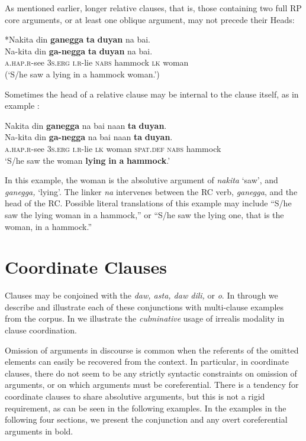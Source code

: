 As mentioned earlier, longer relative clauses, that is, those containing two full RP core arguments, or at least one oblique argument, may not precede their Heads:

\ea
*Nakita  din  \textbf{ganegga}  \textbf{ta}  \textbf{duyan}  na  bai. \smallskip\\
\gll *Na-kita  din  \textbf{ga-negga}  \textbf{ta}  \textbf{duyan}  na  bai. \\
\textsc{a.hap.r}-see  3\textsc{s.erg}  \textsc{i.r}-lie  \textsc{nabs}  hammock  \textsc{lk}  woman \\
\glt (‘S/he saw a lying in a hammock woman.’)
\z

Sometimes the head of a relative clause may be internal to the clause itself, as in example :

\ea
\label{bkm:Ref474907787}
Nakita  din  \textbf{ganegga}  na  bai  naan  \textbf{ta}  \textbf{duyan}. \smallskip\\
\gll Na-kita  din  \textbf{ga-negga}  na  bai  naan  \textbf{ta}  \textbf{duyan}. \\
\textsc{a.hap.r}-see  3\textsc{s.erg}  \textsc{i.r}-lie  \textsc{lk}  woman  \textsc{spat.def}  \textsc{nabs}  hammock \\
\glt ‘S/he saw the woman \textbf{lying} \textbf{in} \textbf{a} \textbf{hammock}.’
\z

In this example, the woman is the absolutive argument of \textit{nakita} ‘saw’, and \textit{ganegga,} ‘lying’. The linker \textit{na} intervenes between the RC verb, \textit{ganegga}, and the head of the RC. Possible literal translations of this example may include “S/he saw the lying woman in a hammock,”  or “S/he saw the lying one, that is the woman, in a hammock.”
\section{Coordinate Clauses}
\label{sec:coordinateclauses}
Clauses may be conjoined with the  \textit{daw, asta, daw dili,} or \textit{o}. In  through  we describe and illustrate each of these conjunctions with multi-clause examples from the corpus. In  we illustrate the \textit{culminative} usage of irrealis modality in clause coordination.

Omission of arguments in discourse is common when the referents of the omitted elements can easily be recovered from the context. In particular, in coordinate clauses, there do not seem to be any strictly syntactic constraints on omission of arguments, or on which arguments must be coreferential. There is a tendency for coordinate clauses to share absolutive arguments, but this is not a rigid requirement, as can be seen in the following examples. In the examples in the following four sections, we present the conjunction and any overt coreferential arguments in bold.

